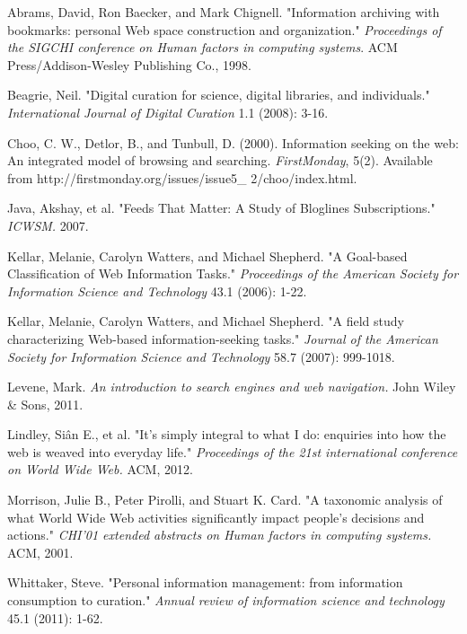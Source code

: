 \documentclass{casconpaper}
\begin{document}
{\begin{thebibliography}{9}
 Abrams, David, Ron Baecker, and Mark Chignell. "Information archiving with bookmarks: personal Web space construction and organization." \emph{Proceedings of the SIGCHI conference on Human factors in computing systems}. ACM Press/Addison-Wesley Publishing Co., 1998.


Beagrie, Neil. "Digital curation for science, digital libraries, and individuals." \emph{International Journal of Digital Curation} 1.1 (2008): 3-16.

Choo, C. W., Detlor, B., and Tunbull, D. (2000). Information seeking on the web: An integrated model of browsing and searching.  \emph{FirstMonday}, 5(2). Available from http://firstmonday.org/issues/issue5\_
2/choo/index.html.

	Java, Akshay, et al. "Feeds That Matter: A Study of Bloglines 		Subscriptions." \emph{ ICWSM.} 2007.
   
 Kellar, Melanie, Carolyn Watters, and Michael Shepherd. "A Goal-based Classification of Web Information Tasks." \emph{Proceedings of the American Society for Information Science and Technology} 43.1 (2006): 1-22.

Kellar, Melanie, Carolyn Watters, and Michael Shepherd. "A field study characterizing Web-based information-seeking tasks." \emph{Journal of the American Society for Information Science and Technology} 58.7 (2007): 999-1018.

Levene, Mark.  \emph{An introduction to search engines and web navigation.} John Wiley \& Sons, 2011.

Lindley, Siân E., et al. "It's simply integral to what I do: enquiries into how the web is weaved into everyday life." \emph{Proceedings of the 21st international conference on World Wide Web.} ACM, 2012.

Morrison, Julie B., Peter Pirolli, and Stuart K. Card. "A taxonomic analysis of what World Wide Web activities significantly impact people's decisions and actions." \emph{CHI'01 extended abstracts on Human factors in computing systems.} ACM, 2001.

Whittaker, Steve. "Personal information management: from information consumption to curation." \emph{Annual review of information science and technology} 45.1 (2011): 1-62.
    
\end{thebibliography}
} %
\end{document}
